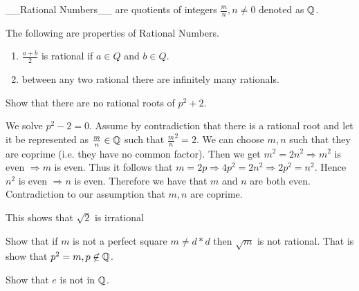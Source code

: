 \begin{definition}
	__Rational Numbers__ are quotients of integers \( \frac{m}{n}, n \not = 0 \) denoted as
	\( \mathbb{Q} \).
	\label{Rational}
\end{definition}

\begin{corollary}[Properties]
	The following are properties of Rational Numbers.
	\begin{enumerate}[]
		\item \( \frac{a+b}{2} \) is rational if \( a \in Q \) and \( b \in Q \).
		\item between any two rational there are infinitely many rationals.
	\end{enumerate}
	\label{RationalProperties}
\end{corollary}

\begin{example}
	Show that there are no rational roots of \( p^2 + 2 \).
\end{example}

\begin{solution}
	We solve \( p^2 - 2 = 0 \). Assume by contradiction that there is a rational root and let it
	be represented as \( \frac{m}{n} \in \mathbb{Q} \) such that \( \frac{m}{n}^2 = 2 \). We can choose
	\( m,n \) such that they are coprime (i.e. they have no common factor).  Then we get
	\( m^2 = 2n^2 \Rightarrow m^2 \) is even \( \Rightarrow m \) is even. Thus it follows that
	\( m = 2p \Rightarrow 4p^2 = 2n^2 \Rightarrow 2p^2 = n^2 \). Hence \( n^2 \) is even \(
	\Rightarrow n \) is even. Therefore we have that \( m \) and \( n \) are both even.
	Contradiction to our assumption that \( m,n \) are coprime.
\end{solution}

\begin{note}
	This shows that \( \sqrt{2} \) is irrational
\end{note}

\begin{exercise}
	Show that if \( m \) is not a perfect square \( m \not = d*d \) then \( \sqrt{m} \) is not
	rational. That is show that \( p^2 = m, p \not \in \mathbb{Q} \).
\end{exercise}

\begin{example}
	Show that \( e \) is not in \( \mathbb{Q} \).
\end{example}

